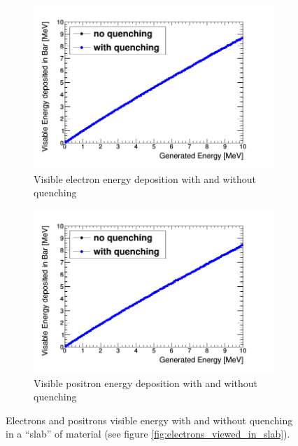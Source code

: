 \begin{figure}[htbp]
\centering
\begin{subfigure}{.5\textwidth}
  \centering
  \includegraphics[width=\linewidth]{quench_eng_LinElectrons.png}
  \captionsetup{width=.9\linewidth}
  \caption{Visible electron energy deposition with and without quenching}
  \label{subFig:electron_quenched_and_not}
\end{subfigure}%
\begin{subfigure}{.5\textwidth}
  \centering
  \includegraphics[width=\linewidth]{quench_eng_LinPositrons.png}
  \captionsetup{width=.9\linewidth}
  \caption{Visible positron energy deposition with and without quenching}
  \label{subFig:positron_quenched_and_not}
\end{subfigure}
\caption{Electrons and positrons visible energy with and without quenching in a ``slab'' of material (see figure \ref{fig:electrons_viewed_in_slab}).}
\label{fig:electron_positron_quenched_and_not}
\end{figure}

